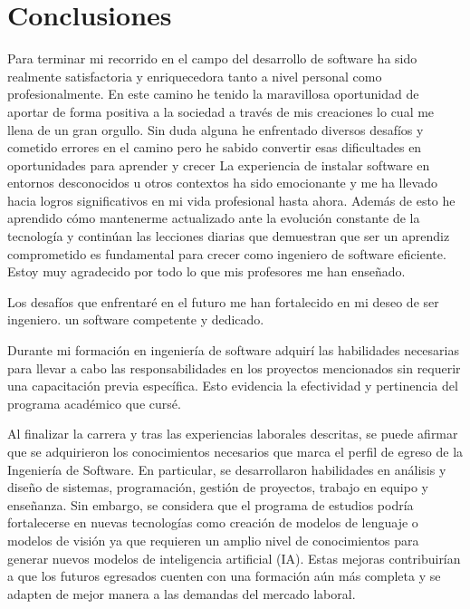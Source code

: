 \documentclass[protocolo.tex]{subfiles}
\begin{document}
\section{Conclusiones}
Para terminar mi recorrido en el campo del desarrollo de software ha sido realmente satisfactoria y enriquecedora tanto a nivel personal como profesionalmente. En este camino he tenido la maravillosa oportunidad de aportar de forma positiva a la sociedad a través de mis creaciones lo cual me llena de un gran orgullo. Sin duda alguna he enfrentado diversos desafíos y cometido errores en el camino pero he sabido convertir esas dificultades en oportunidades para aprender y crecer La experiencia de instalar software en entornos desconocidos u otros contextos ha sido emocionante y me ha llevado hacia logros significativos en mi vida profesional hasta ahora. Además de esto he aprendido cómo mantenerme actualizado ante la evolución constante de la tecnología y continúan las lecciones diarias que demuestran que ser un aprendiz comprometido es fundamental para crecer como ingeniero de software eficiente.
Estoy muy agradecido por todo lo que mis profesores me han enseñado.

Los desafíos que enfrentaré en el futuro me han fortalecido en mi deseo de ser ingeniero.
un software competente y dedicado.

Durante mi formación en ingeniería de software adquirí las habilidades necesarias para llevar a cabo las responsabilidades en los proyectos mencionados sin requerir una capacitación previa específica. Esto evidencia la efectividad y pertinencia del programa académico que cursé.

Al finalizar la carrera y tras las experiencias laborales descritas, se puede afirmar que se  adquirieron los conocimientos necesarios que marca el perfil de egreso de la Ingeniería de Software. En particular, 
se desarrollaron habilidades en análisis y diseño de sistemas, programación, gestión de proyectos, trabajo en equipo y enseñanza. Sin embargo, se considera que el programa de estudios podría fortalecerse en nuevas tecnologías como creación de modelos de lenguaje o modelos de visión ya que requieren un amplio nivel de conocimientos para generar nuevos modelos de inteligencia artificial (IA).  Estas mejoras contribuirían a que los futuros egresados cuenten con una formación aún más completa y se adapten de mejor manera a las demandas del mercado laboral.
\end{document}
